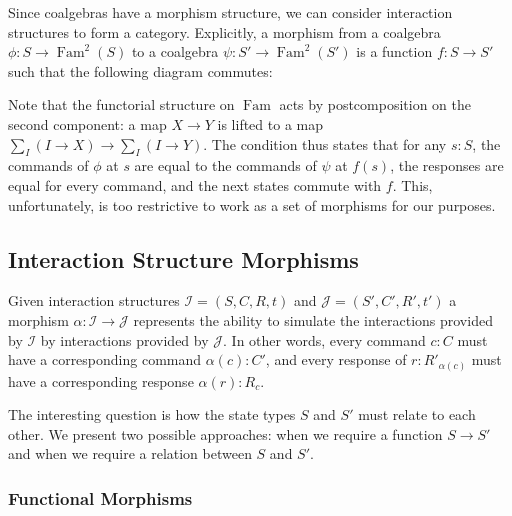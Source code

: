 \documentclass{article}
\theoremstyle{definition}
\DeclareMathOperator{\Fam}{Fam}
\begin{document}
    Since coalgebras have a morphism
    structure, we can consider interaction structures to form a category.  Explicitly, a morphism from a coalgebra $\phi
    : S \to \Fam^2(S)$ to a coalgebra $\psi : S' \to \Fam^2(S')$ is a function $f : S \to S'$ such that the following
    diagram commutes:

    \begin{center}
    \end{center}

    Note that the functorial structure on $\Fam$ acts by postcomposition on the second component: a map $X \to Y$ is
    lifted to a map $\sum_I (I \to X) \to \sum_I (I \to Y)$.  The condition thus states that for any $s : S$, the
    commands of $\phi$ at $s$ are equal to the commands of $\psi$ at $f(s)$, the responses are equal for every command,
    and the next states commute with $f$.  This, unfortunately, is too restrictive to work as a set of morphisms for our
    purposes.

    \subsection{Interaction Structure Morphisms}

    Given interaction structures $\mathcal{I} = (S, C, R, t)$ and $\mathcal{J} = (S', C', R', t')$ a morphism $\alpha :
    \mathcal{I} \to \mathcal{J}$ represents the ability to simulate the interactions provided by $\mathcal{I}$ by
    interactions provided by $\mathcal{J}$.  In other words, every command $c : C$ must have a corresponding command
    $\alpha(c) : C'$, and every response of $r : R'_{\alpha(c)}$ must have a corresponding response $\alpha(r) : R_c$.

    The interesting question is how the state types $S$ and $S'$ must relate to each other.  We present two possible
    approaches: when we require a function $S \to S'$ and when we require a relation between $S$ and $S'$.

    \subsubsection{Functional Morphisms}
\end{document}
